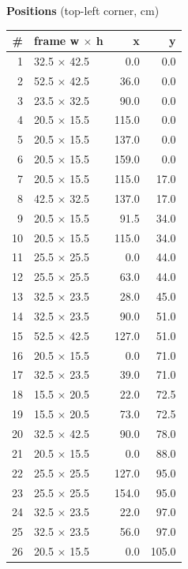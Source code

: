 \documentclass[a4paper,landscape,10pt]{article}
\begin{document}
\begin{minipage}[t]{0.25\textwidth}
\vspace{8pt}
{\bfseries Positions} (top-left corner, cm)\\[2pt]
\tiny
\begin{tabular}{@{}r l r r@{}}
\toprule
\# & frame w $\times$ h & x & y \\
\midrule
1 & 32.5 $\times$ 42.5 & 0.0 & 0.0 \\
2 & 52.5 $\times$ 42.5 & 36.0 & 0.0 \\
3 & 23.5 $\times$ 32.5 & 90.0 & 0.0 \\
4 & 20.5 $\times$ 15.5 & 115.0 & 0.0 \\
5 & 20.5 $\times$ 15.5 & 137.0 & 0.0 \\
6 & 20.5 $\times$ 15.5 & 159.0 & 0.0 \\
7 & 20.5 $\times$ 15.5 & 115.0 & 17.0 \\
8 & 42.5 $\times$ 32.5 & 137.0 & 17.0 \\
9 & 20.5 $\times$ 15.5 & 91.5 & 34.0 \\
10 & 20.5 $\times$ 15.5 & 115.0 & 34.0 \\
11 & 25.5 $\times$ 25.5 & 0.0 & 44.0 \\
12 & 25.5 $\times$ 25.5 & 63.0 & 44.0 \\
13 & 32.5 $\times$ 23.5 & 28.0 & 45.0 \\
14 & 32.5 $\times$ 23.5 & 90.0 & 51.0 \\
15 & 52.5 $\times$ 42.5 & 127.0 & 51.0 \\
16 & 20.5 $\times$ 15.5 & 0.0 & 71.0 \\
17 & 32.5 $\times$ 23.5 & 39.0 & 71.0 \\
18 & 15.5 $\times$ 20.5 & 22.0 & 72.5 \\
19 & 15.5 $\times$ 20.5 & 73.0 & 72.5 \\
20 & 32.5 $\times$ 42.5 & 90.0 & 78.0 \\
21 & 20.5 $\times$ 15.5 & 0.0 & 88.0 \\
22 & 25.5 $\times$ 25.5 & 127.0 & 95.0 \\
23 & 25.5 $\times$ 25.5 & 154.0 & 95.0 \\
24 & 32.5 $\times$ 23.5 & 22.0 & 97.0 \\
25 & 32.5 $\times$ 23.5 & 56.0 & 97.0 \\
26 & 20.5 $\times$ 15.5 & 0.0 & 105.0 \\
\bottomrule
\end{tabular}
\end{minipage}
\clearpage
\end{document}

